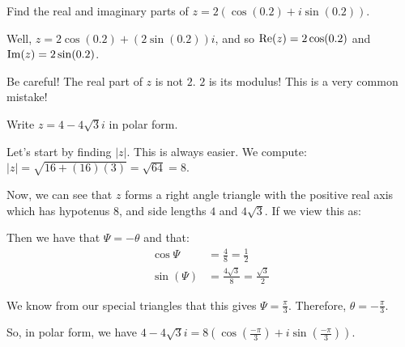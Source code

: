 \begin{ex}{}{} Find the real and imaginary parts of $z = 2(\cos(0.2) + i\sin(0.2))$.

Well, $z = 2\cos(0.2) + (2\sin(0.2))i$, and so $\operatorname{Re}(z) = 2\cos(0.2)$ and $\operatorname{Im}(z) = 2\sin(0.2)$.

\end{ex}

\begin{note} Be careful! The real part of $z$ is not $2$. $2$ is its modulus! This is a very common mistake!\end{note}


\begin{ex}{}{} Write $z = 4 - 4\sqrt{3}i$ in polar form.

Let's start by finding $|z|$. This is always easier. We compute: $|z| = \sqrt{16 + (16)(3)} = \sqrt{64} = 8$.

Now, we can see that $z$ forms a right angle triangle with the positive real axis which has hypotenus $8$, and side lengths $4$ and $4\sqrt{3}$. If we view this as:

\begin{center}
\end{center}

Then we have that $\Psi = -\theta$ and that:
\begin{align*} \cos\Psi &= \frac{4}{8} = \frac{1}{2}\\
\sin(\Psi) &= \frac{4\sqrt{3}}{8} = \frac{\sqrt{3}}{2}
\end{align*}

We know from our special triangles that this gives $\Psi = \frac{\pi}{3}$. Therefore, $\theta = -\frac{\pi}{3}$.

So, in polar form, we have $4 - 4\sqrt{3}i = 8\left(\cos\left(\frac{-\pi}{3}\right) + i\sin\left(\frac{-\pi}{3}\right)\right)$.

\end{ex}

